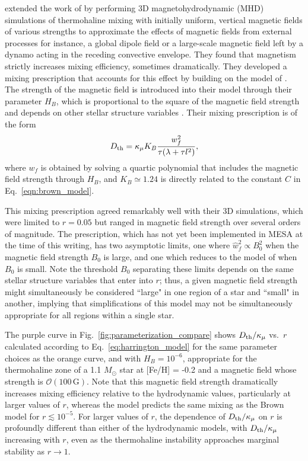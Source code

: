\citet{harrington} extended the work of \citet{brown_etal_2013} by performing 3D magnetohydrodynamic (MHD) simulations of thermohaline mixing with initially uniform, vertical magnetic fields of various strengths to approximate the effects of magnetic fields from external processes  for instance, a global dipole field or a large-scale magnetic field left by a dynamo acting in the receding convective envelope. 
They found that magnetism strictly increases mixing efficiency, sometimes dramatically.
They developed a mixing prescription that accounts for this effect by building on the model of \citet{brown_etal_2013}.
The strength of the magnetic field is introduced into their model through their parameter $H_B$, which is proportional to the square of the magnetic field strength and depends on other stellar structure variables \citep[see Eq.~19 of][]{harrington}.
Their mixing prescription is of the form
\begin{equation} \label{eq:harrington_model}
    \Dth = \kappa_{\mu}K_B\frac{w_f^2}{\tau (\lambda + \tau l^2)},
\end{equation}
where $w_f$ is obtained by solving a quartic polynomial that includes the magnetic field strength through $H_B$, and $K_B \simeq 1.24$ is directly related to the constant $C$ in Eq.~\eqref{eqn:brown_model}.

This mixing prescription agreed remarkably well with their 3D simulations, which were limited to $r = 0.05$ but ranged in magnetic field strength over several orders of magnitude.
The prescription, which has not yet been implemented in MESA at the time of this writing, has two asymptotic limits, one where $\hat{w}_f^2 \propto B_0^2$ when the magnetic field strength $B_0$ is large, and one which reduces to the model of \citet{brown_etal_2013} when $B_0$ is small. 
Note the threshold $B_0$ separating these limits depends on the same stellar structure variables that enter into $r$; thus, a given magnetic field strength might simultaneously be considered ``large" in one region of a star and ``small" in another, implying that simplifications of this model may not be simultaneously appropriate for all regions within a single star.

The purple curve in Fig.~\ref{fig:parameterization_compare} shows $D_\mathrm{th}/\kappa_\mu$ vs.~$r$ calculated according to Eq.~\eqref{eq:harrington_model} for the same parameter choices as the orange curve, and with $H_B = 10^{-6}$, appropriate for the thermohaline zone of a 1.1 $M_\odot$ star at [Fe/H] = -0.2 and a magnetic field whose strength is $\mathcal{O}(100 \,\mathrm{G})$. 
Note that this magnetic field strength dramatically increases mixing efficiency relative to the hydrodynamic values, particularly at larger values of $r$, whereas the model predicts the same mixing as the Brown model for $r \lesssim 10^{-5}$. 
For larger values of $r$, the dependence of $D_\mathrm{th}/\kappa_\mu$ on $r$ is profoundly different than either of the hydrodynamic models, with $D_\mathrm{th}/\kappa_\mu$ increasing with $r$, even as the thermohaline instability approaches marginal stability as $r \to 1$.

